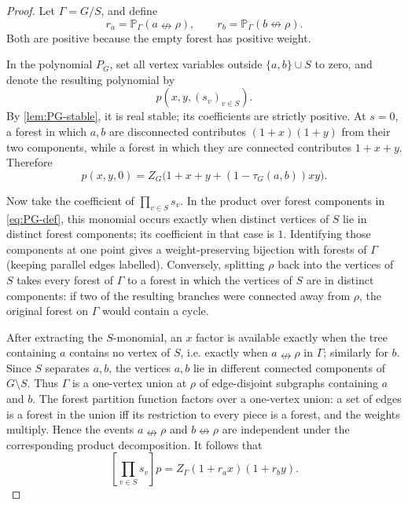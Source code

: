 \documentclass[11pt]{article}
\theoremstyle{definition}
\theoremstyle{remark}
\newcommand{\PP}{\mathbb P}
\newcommand{\1}{\mathbf 1}
\begin{document}
\begin{proof}
Let $\Gamma=G/S$, and define
\begin{equation}
 r_a=\PP_\Gamma(a\nleftrightarrow\rho),\qquad
 r_b=\PP_\Gamma(b\nleftrightarrow\rho).
\end{equation}
Both are positive because the empty forest has positive weight.

In the polynomial $P_G$, set all vertex variables outside $\{a,b\}\cup S$ to zero,
and denote the resulting polynomial by
\begin{equation}
 p(x,y,(s_v)_{v\in S}).
\end{equation}
By \cref{lem:PG-stable}, it is real stable; its coefficients are strictly positive.
At $s=0$, a forest in which $a,b$ are disconnected contributes
$(1+x)(1+y)$ from their two components, while a forest in which they are connected
contributes $1+x+y$.  Therefore
\begin{equation}\label{eq:p-szero}
 p(x,y,0)=Z_G\bigl(1+x+y+(1-\tau_G(a,b))xy\bigr).
\end{equation}

Now take the coefficient of $\prod_{v\in S}s_v$.  In the product over forest
components in \eqref{eq:PG-def}, this monomial occurs exactly when distinct vertices
of $S$ lie in distinct forest components; its coefficient in that case is $1$.
Identifying those components at one point gives a weight-preserving bijection with
forests of $\Gamma$ (keeping parallel edges labelled).  Conversely, splitting $\rho$
back into the vertices of $S$ takes every forest of $\Gamma$ to a forest in which the
vertices of $S$ are in distinct components: if two of the resulting branches were
connected away from $\rho$, the original forest on $\Gamma$ would contain a cycle.

After extracting the $S$-monomial, an $x$ factor is available exactly when the tree
containing $a$ contains no vertex of $S$, i.e. exactly when $a\nleftrightarrow\rho$
in $\Gamma$; similarly for $b$.  Since $S$ separates $a,b$, the vertices $a,b$ lie in
different connected components of $G\setminus S$.  Thus $\Gamma$ is a one-vertex
union at $\rho$ of edge-disjoint subgraphs containing $a$ and $b$.  The forest
partition function factors over a one-vertex union: a set of edges is a forest in the
union iff its restriction to every piece is a forest, and the weights multiply.
Hence the events $a\nleftrightarrow\rho$ and $b\nleftrightarrow\rho$ are independent
under the corresponding product decomposition.  It follows that
\begin{equation}\label{eq:p-topS}
 [\prod_{v\in S}s_v]p
 =Z_\Gamma(1+r_ax)(1+r_by).
\end{equation}


\end{proof}
\end{document}
